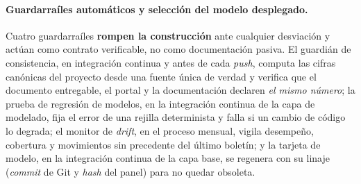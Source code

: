 \documentclass[12pt,letterpaper]{report}
\begin{document}
\paragraph{Guardarraíles automáticos y selección del modelo desplegado.} Cuatro guardarraíles
\textbf{rompen la construcci\'on} ante cualquier desviaci\'on y actúan como contrato verificable,
no como documentaci\'on pasiva. El guardi\'an de consistencia, en integración continua y antes de
cada \textit{push}, computa las cifras canónicas del proyecto desde una fuente \'unica de verdad y
verifica que el documento entregable, el portal y la documentaci\'on declaren \textit{el mismo
n\'umero}; la prueba de regresi\'on de modelos, en la integración continua de la capa de modelado,
fija el error de una rejilla determinista y falla si un cambio de c\'odigo lo degrada; el monitor
de \textit{drift}, en el proceso mensual, vigila desempe\~no, cobertura y movimientos sin
precedente del \'ultimo bolet\'in; y la tarjeta de modelo, en la integración continua de la capa
base, se regenera con su linaje
(\textit{commit} de Git y \textit{hash} del panel) para no quedar obsoleta.
\end{document}
